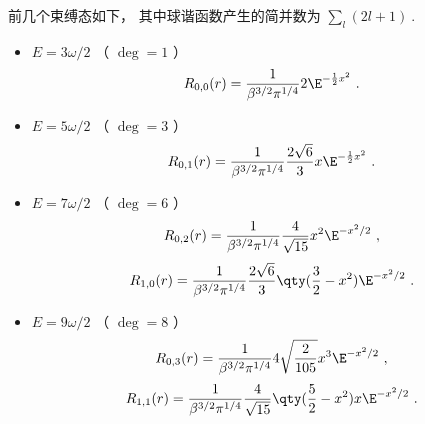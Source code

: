 前几个束缚态如下， 其中球谐函数产生的简并数为 $\sum_l (2l + 1)~.$
\begin{itemize}
\item $E = 3 \omega /2$ （ $\deg  = 1$ ）
\begin{equation}
R_{0,0}(r) = \frac{1}{\beta^{3/2} \pi^{1/4}} 2\E^{-\frac12 x^2}~.
\end{equation}

\item $E = 5 \omega /2$ （ $\deg  = 3$ ）
\begin{equation}
R_{0,1}(r) = \frac{1}{\beta^{3/2} \pi^{1/4}} \frac{2\sqrt 6}{3} x \E^{-\frac12 x^2}~.
\end{equation}

\item $E = 7 \omega /2$ （ $\deg  = 6$ ）
\begin{equation}
R_{0,2}(r) = \frac{1}{\beta^{3/2} \pi^{1/4}} \frac{4}{\sqrt{15}} x^2 \E^{- x^2/2}~,
\end{equation}
\begin{equation}
R_{1,0}(r) = \frac{1}{\beta^{3/2} \pi^{1/4}} \frac{2\sqrt 6}{3} \qty(\frac32 - x^2) \E^{-x^2/2}~.
\end{equation}

\item $E = 9 \omega /2$ （ $\deg  = 8$ ）
\begin{equation}
R_{0,3}(r) = \frac{1}{\beta^{3/2} \pi^{1/4}} 4\sqrt{\frac{2}{105}} x^3 \E^{-x^2/2}~,
\end{equation}
\begin{equation}
R_{1,1}(r) = \frac{1}{\beta^{3/2} \pi^{1/4}} \frac{4}{\sqrt{15}} \qty(\frac52 - x^2) x \E^{-x^2/2}~.
\end{equation}
\end{itemize}
